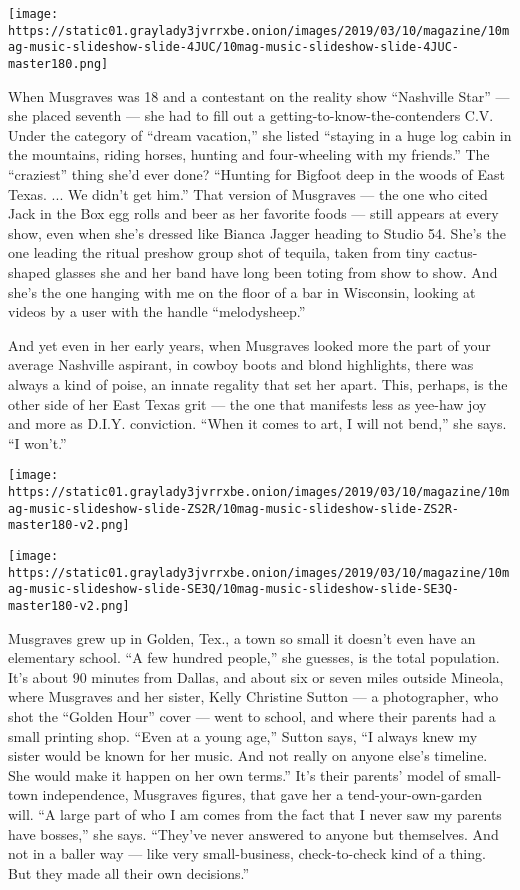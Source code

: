\texttt{[image: https://static01.graylady3jvrrxbe.onion/images/2019/03/10/magazine/10mag-music-slideshow-slide-4JUC/10mag-music-slideshow-slide-4JUC-master180.png]}

When Musgraves was 18 and a contestant on the reality show ``Nashville
Star'' --- she placed seventh --- she had to fill out a
getting-to-know-the-contenders C.V. Under the category of ``dream
vacation,'' she listed ``staying in a huge log cabin in the mountains,
riding horses, hunting and four-wheeling with my friends.'' The
``craziest'' thing she'd ever done? ``Hunting for Bigfoot deep in the
woods of East Texas. ... We didn't get him.'' That version of Musgraves
--- the one who cited Jack in the Box egg rolls and beer as her favorite
foods --- still appears at every show, even when she's dressed like
Bianca Jagger heading to Studio 54. She's the one leading the ritual
preshow group shot of tequila, taken from tiny cactus-shaped glasses she
and her band have long been toting from show to show. And she's the one
hanging with me on the floor of a bar in Wisconsin, looking at videos by
a user with the handle ``melodysheep.''

And yet even in her early years, when Musgraves looked more the part of
your average Nashville aspirant, in cowboy boots and blond highlights,
there was always a kind of poise, an innate regality that set her apart.
This, perhaps, is the other side of her East Texas grit --- the one that
manifests less as yee-haw joy and more as D.I.Y. conviction. ``When it
comes to art, I will not bend,'' she says. ``I won't.''

\texttt{[image: https://static01.graylady3jvrrxbe.onion/images/2019/03/10/magazine/10mag-music-slideshow-slide-ZS2R/10mag-music-slideshow-slide-ZS2R-master180-v2.png]}

\texttt{[image: https://static01.graylady3jvrrxbe.onion/images/2019/03/10/magazine/10mag-music-slideshow-slide-SE3Q/10mag-music-slideshow-slide-SE3Q-master180-v2.png]}

Musgraves grew up in Golden, Tex., a town so small it doesn't even have
an elementary school. ``A few hundred people,'' she guesses, is the
total population. It's about 90 minutes from Dallas, and about six or
seven miles outside Mineola, where Musgraves and her sister, Kelly
Christine Sutton --- a photographer, who shot the ``Golden Hour'' cover
--- went to school, and where their parents had a small printing shop.
``Even at a young age,'' Sutton says, ``I always knew my sister would be
known for her music. And not really on anyone else's timeline. She would
make it happen on her own terms.'' It's their parents' model of
small-town independence, Musgraves figures, that gave her a
tend-your-own-garden will. ``A large part of who I am comes from the
fact that I never saw my parents have bosses,'' she says. ``They've
never answered to anyone but themselves. And not in a baller way ---
like very small-business, check-to-check kind of a thing. But they made
all their own decisions.''


